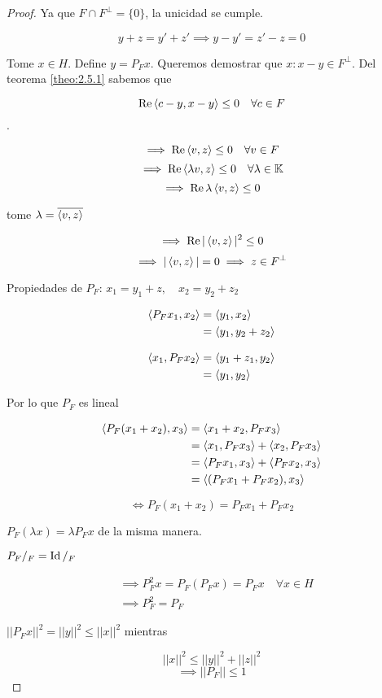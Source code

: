 \begin{proof}
    Ya que $F\cap F^\perp=\{0\}$, la unicidad se cumple.

    \[y+z=y'+z'\implies y-y'=z'-z=0\]

    Tome $x\in H$. Define $y=P_Fx$. Queremos demostrar que $x:x-y\in F^\perp$. Del teorema \ref{theo:2.5.1} sabemos que 
    
    $$\operatorname{Re}\left\langle c-y,x-y\right\rangle\leq 0\quad \forall c\in F$$.

    \[\implies \operatorname{Re} \left\langle v,z\right\rangle\leq 0\quad\forall v\in F\]
    \[\implies \operatorname{Re} \left\langle \lambda v,z\right\rangle\leq 0\quad \forall \lambda\in \mathbb{K}\]
    \[\implies \operatorname{Re} \lambda\left\langle v,z\right\rangle\leq 0\]


    tome $\lambda=\overline{\left\langle v,z\right\rangle}$

    \[\implies\operatorname{Re} |\left\langle v,z\right\rangle|^2\leq 0\]
    \[\implies |\left\langle v,z\right\rangle|=0\implies z\in F^\perp\]

    \large{Propiedades de $P_F$:} $x_1=y_1+z,\quad x_2=y_2+z_2$

    \begin{align*}
        \left\langle P_Fx_1,x_2\right\rangle&=\left\langle y_1,x_2\right\rangle\\
        &=\left\langle y_1,y_2+z_2\right\rangle\\
    \end{align*}

    \begin{align*}
        \left\langle x_1,P_F x_2\right\rangle&=\left\langle y_1+z_1,y_2\right\rangle\\
        &=\left\langle y_1,y_2\right\rangle
    \end{align*}

    Por lo que $P_F$ es lineal

    \begin{align*}
        \left\langle P_F(x_1+x_2),x_3\right\rangle&=\left\langle x_1+x_2,P_F x_3\right\rangle\\
        &=\left\langle x_1,P_Fx_3\right\rangle+\left\langle x_2,P_Fx_3\right\rangle\\
        &=\left\langle P_Fx_1,x_3\right\rangle+\left\langle P_Fx_2,x_3\right\rangle\\
        &=\left\langle (P_Fx_1+P_Fx_2),x_3\right\rangle
    \end{align*}

    \[\iff P_F(x_1+x_2)=P_Fx_1+P_Fx_2\]

    $P_F(\lambda x)=\lambda P_F x$ de la misma manera.

    $P_F/_F=\operatorname{Id}/_F$ 

    \begin{align*}
        &\implies P_F^2 x=P_F(P_Fx)=P_F x\quad \forall x\in H\\
        &\implies P_F^2=P_F
    \end{align*}

    $||P_F x||^2=||y||^2\leq ||x||^2$ mientras

    \[||x||^2\leq ||y||^2+||z||^2\]
    \[\implies ||P_F||\leq 1\]

\end{proof}

